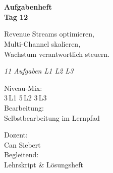 \documentclass[11pt,a4paper,oneside]{article}
\newcommand{\caveatfontfallback}{\itshape}
\newcommand\caveatfont{\caveatfontfallback}%
\begin{document}
\begin{titlepage}
  \pagestyle{empty}
  \vspace*{1.5cm}
  \\[2pt]
  \noindent{\color{lpAccent}\rule{\linewidth}{1.2pt}}\\[4pt]

  \vspace{3cm}
  {\sffamily\fontsize{30}{34}\selectfont\bfseries\color{lpInk}Aufgabenheft\\Tag 12\par}

  \vspace{0.7cm}
  {\sffamily\large\color{lpGray}Revenue Streams optimieren,\\Multi-Channel skalieren,\\Wachstum verantwortlich steuern.\par}

  \vspace{1.5cm}
  {\caveatfont\LARGE\color{lpAmber}11 Aufgaben \textperiodcentered{} L1 \textperiodcentered{} L2 \textperiodcentered{} L3}\par

  \vfill

  \noindent\begin{minipage}{0.55\linewidth}
    {\sffamily\footnotesize\color{lpGray}Niveau-Mix:}\\
    {\sffamily\small\color{lpInk}3\,\textsf{L1} \textperiodcentered{} 5\,\textsf{L2} \textperiodcentered{} 3\,\textsf{L3}}\\[10pt]
    {\sffamily\footnotesize\color{lpGray}Bearbeitung:}\\
    {\sffamily\small\color{lpInk}Selbstbearbeitung im Lernpfad}
  \end{minipage}\hfill
  \begin{minipage}{0.4\linewidth}
    \raggedleft
    {\sffamily\footnotesize\color{lpGray}Dozent:}\\
    {\sffamily\small\color{lpInk}Can Siebert}\\[10pt]
    {\sffamily\footnotesize\color{lpGray}Begleitend:}\\
    {\sffamily\small\color{lpInk}Lehrskript \& Lösungsheft}
  \end{minipage}

  \vspace{0.5cm}
  \noindent{\color{lpAccent}\rule{\linewidth}{0.6pt}}
\end{titlepage}
\end{document}
